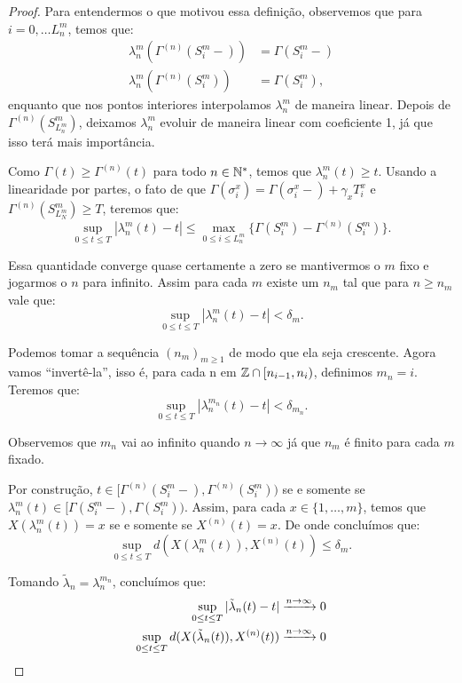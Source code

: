 \begin{proof}
  Para entendermos o que motivou essa definição, observemos que para $i =
  0, \ldots L_n^m$, temos que:
  \begin{align*}
    \lambda_n^m(\Gamma^{(n)}(S_i^m-)) &= \Gamma(S_i^m-)\\
    \lambda_n^m(\Gamma^{(n)}(S_i^m)) &= \Gamma(S_i^m),
  \end{align*}
  enquanto que nos pontos interiores interpolamos $\lambda_n^m$ de
  maneira linear. Depois de $\Gamma^{(n)}(S^m_{L_n^m})$, deixamos
  $\lambda_n^m$ evoluir de maneira linear com coeficiente 1, já que
  isso terá mais importância.

  Como $\Gamma(t) \geq \Gamma^{(n)}(t)$ para todo $n \in {\mathbb{N^*}}$, temos
  que $\lambda_n^m(t) \geq t$. Usando a linearidade por partes, o fato
  de que $\Gamma(\sigma^x_i) = \Gamma(\sigma_i^x-) + \gamma_x T^x_i$ e
  $\Gamma^{(n)}(S^m_{L_N^m}) \geq T$, teremos que:
  \begin{displaymath}
    \sup_{0 \leq t \leq T} |\lambda_n^m(t) - t| \leq
    \max_{0 \leq i \leq L_n^m} \{ \Gamma(S_i^m) -
    \Gamma^{(n)}(S_i^m)\}.
  \end{displaymath}

  Essa quantidade converge quase certamente a zero se mantivermos o
  $m$ fixo e jogarmos o $n$ para infinito. Assim para cada $m$ existe
  um $n_m$ tal que para $n \geq n_m$ vale que:
  \begin{displaymath}
    \sup_{0 \leq t \leq T} |\lambda_n^m(t) - t| < \delta_m.
  \end{displaymath}

  Podemos tomar a sequência $(n_m)_{m \geq 1}$ de modo que ela seja
  crescente. Agora vamos ``invertê-la'', isso é, para cada n em ${\mathbb{Z}}
  \cap [n_{i-1}, n_i)$, definimos $m_n = i$. Teremos que:
  \begin{displaymath}
    \sup_{0 \leq t \leq T} |\lambda_n^{m_n}(t) - t| < \delta_{m_n}.
  \end{displaymath}

  Observemos que $m_n$ vai ao infinito quando $n \to \infty$ já que
  $n_m$ é finito para cada $m$ fixado.
  
  Por construção, $t \in [\Gamma^{(n)}(S_{i}^m-),
  \Gamma^{(n)}(S_{i}^m))$ se e somente se $\lambda_n^m(t) \in
  [\Gamma(S_{i}^m-), \Gamma(S_{i}^m))$. Assim, para cada $x \in \{1,
  \ldots, m\}$, temos que $X(\lambda_n^m(t)) = x$ se e somente se
  $X^{(n)}(t) = x$. De onde concluímos que:
  \begin{displaymath}
    \sup_{0 \leq t \leq T} d\left(X(\lambda_n^m(t)), X^{(n)} (t)\right)
    \leq \delta_m.
  \end{displaymath}

  Tomando $\tilde{\lambda}_n = \lambda_n^{m_n}$, concluímos que:
  \begin{align*}
    \sup_{0 \leq t \leq T} |\tilde{\lambda}_n(t) - t|
    &\xrightarrow{n\to\infty} 0 \\
    \sup_{0 \leq t \leq T} d(X(\tilde{\lambda}_n(t)), X^{(n)}(t))
    &\xrightarrow{n\to\infty} 0
    \qedhere
  \end{align*}
\end{proof}

